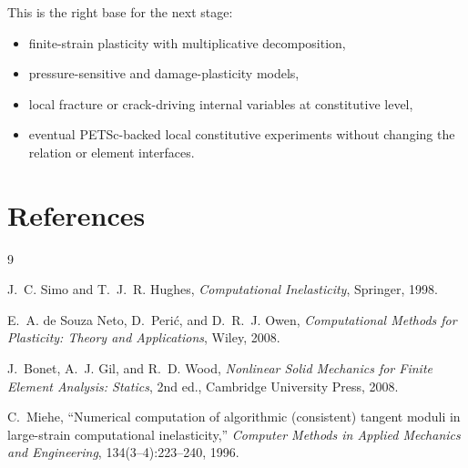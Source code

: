 This is the right base for the next stage:
\begin{itemize}
  \item finite-strain plasticity with multiplicative decomposition,
  \item pressure-sensitive and damage-plasticity models,
  \item local fracture or crack-driving internal variables at constitutive
        level,
  \item eventual PETSc-backed local constitutive experiments without changing
        the relation or element interfaces.
\end{itemize}

\section{References}

\begin{thebibliography}{9}

J.~C. Simo and T.~J.~R. Hughes,
\emph{Computational Inelasticity},
Springer, 1998.

E.~A. de Souza Neto, D.~Peri\'{c}, and D.~R.~J. Owen,
\emph{Computational Methods for Plasticity: Theory and Applications},
Wiley, 2008.

J.~Bonet, A.~J. Gil, and R.~D. Wood,
\emph{Nonlinear Solid Mechanics for Finite Element Analysis: Statics},
2nd ed., Cambridge University Press, 2008.

C.~Miehe,
``Numerical computation of algorithmic (consistent) tangent moduli in
large-strain computational inelasticity,''
\emph{Computer Methods in Applied Mechanics and Engineering},
134(3--4):223--240, 1996.

\end{thebibliography}
